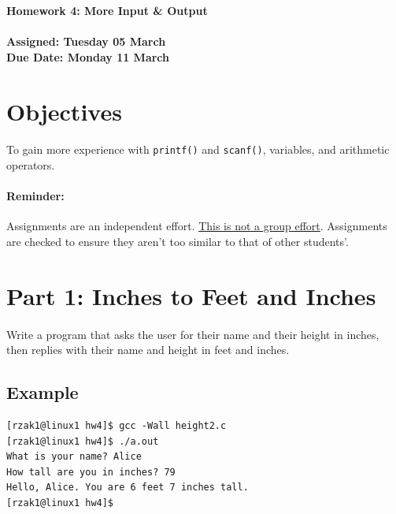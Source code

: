 \documentclass[letter,11pt]{article}
\begin{document}
\huge
\textbf{Homework 4: More Input \& Output}
\normalsize
\\ ~~ \\
\textbf{Assigned: Tuesday 05 March} \\
\textbf{Due Date: Monday 11 March}

\section*{Objectives}
\paragraph{}To gain more experience with \texttt{printf()} and \texttt{scanf()}, variables, and arithmetic operators.

\paragraph{Reminder:} Assignments are an independent effort. \underline{This is not a group effort}. Assignments are checked to ensure they aren't too similar to that of other students'.

\section*{Part 1: Inches to Feet and Inches}
\paragraph{}Write a program that asks the user for their name and their height in inches, then replies with their name and height in feet and inches. 

\subsection*{Example}
\begin{verbatim}
[rzak1@linux1 hw4]$ gcc -Wall height2.c
[rzak1@linux1 hw4]$ ./a.out
What is your name? Alice
How tall are you in inches? 79
Hello, Alice. You are 6 feet 7 inches tall.
[rzak1@linux1 hw4]$ 
\end{verbatim}
\end{document}
